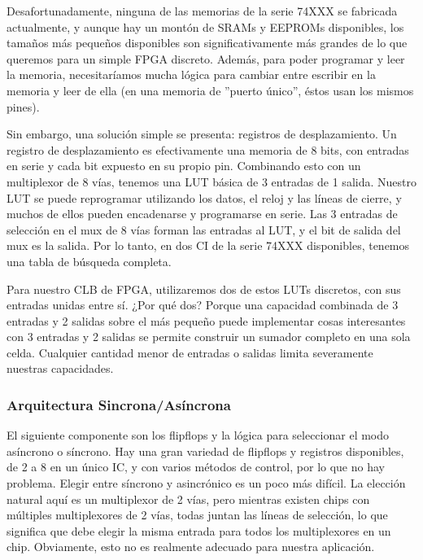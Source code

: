 \documentclass[12pt]{article}
\begin{document}
Desafortunadamente, ninguna de las memorias de la serie 74XXX se fabricada actualmente, y aunque hay un montón de SRAMs y EEPROMs disponibles, los tamaños más pequeños disponibles son significativamente más grandes de lo que queremos para un simple FPGA discreto. Además, para poder programar y leer la memoria, necesitaríamos mucha lógica para cambiar entre escribir en la memoria y leer de ella (en una memoria de ''puerto único'', éstos usan los mismos pines). 
 
Sin embargo, una solución simple se presenta: registros de desplazamiento. Un registro de desplazamiento es efectivamente una memoria de 8 bits, con entradas en serie y cada bit expuesto en su propio pin. Combinando esto con un multiplexor de 8 vías, tenemos una LUT básica de 3 entradas de 1 salida. Nuestro LUT se puede reprogramar utilizando los datos, el reloj y las líneas de cierre, y muchos de ellos pueden encadenarse y programarse en serie. Las 3 entradas de selección en el mux de 8 vías forman las entradas al LUT, y el bit de salida del mux es la salida. Por lo tanto, en dos CI de la serie 74XXX disponibles, tenemos una tabla de búsqueda completa.  
 
Para nuestro CLB de FPGA, utilizaremos dos de estos LUTs discretos, con sus entradas unidas entre sí. ¿Por qué dos? Porque una capacidad combinada de 3 entradas y 2 salidas sobre el más pequeño puede implementar cosas interesantes con 3 entradas y 2 salidas se permite construir un sumador completo en una sola celda. Cualquier cantidad menor de entradas o salidas limita severamente nuestras capacidades.

\subsubsection{Arquitectura Sincrona/Asíncrona}

El siguiente componente son los flipflops y la lógica para seleccionar el modo asíncrono o síncrono. Hay una gran variedad de flipflops y registros disponibles, de 2 a 8 en un único IC, y con varios métodos de control, por lo que no hay problema. Elegir entre síncrono y asincrónico es un poco más difícil. La elección natural aquí es un multiplexor de 2 vías, pero mientras existen chips con múltiples multiplexores de 2 vías, todas juntan las líneas de selección, lo que significa que debe elegir la misma entrada para todos los multiplexores en un chip. Obviamente, esto no es realmente adecuado para nuestra aplicación.
\end{document}

